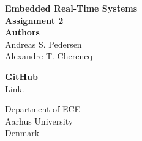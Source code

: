 \documentclass[../main.tex]{subfiles}
\begin{document}
\thispagestyle{empty}

\begin{titlepage}
    \begin{center}
        \vspace*{20pt}
        \textbf{\Huge{Embedded Real-Time Systems}} \\
        \vspace*{20pt}
        \textbf{\large{Assignment 2}} \\
        \vspace*{50pt}
        \textbf{\Large{Authors}} \\
        Andreas S. Pedersen     \\
        Alexandre T. Cherencq   \\

        \vspace{50pt}

        \textbf{\Large{GitHub}} \\
        \href{https://github.com/Ponti17/embedded-rt-systems-assignments}{Link.} \\
        \vfill

        \vspace*{1cm}

        Department of ECE\\
        Aarhus University\\
        Denmark
    \end{center}
\end{titlepage}
\end{document}
